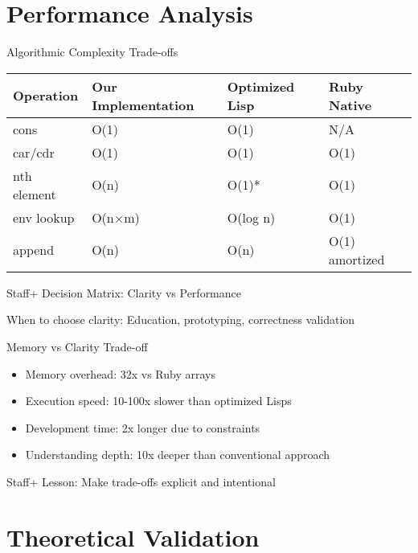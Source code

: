 \documentclass[presentation,aspectratio=169]{beamer}
\begin{document}
\section{Performance Analysis}
\label{sec:org7f197c2}

\begin{frame}[label={sec:org69e4c45}]{Algorithmic Complexity Trade-offs}
\begin{center}
\begin{center}
\begin{tabular}{llll}
Operation & Our Implementation & Optimized Lisp & Ruby Native\\
\hline
cons & O(1) & O(1) & N/A\\
car/cdr & O(1) & O(1) & O(1)\\
nth element & O(n) & O(1)* & O(1)\\
env lookup & O(n×m) & O(log n) & O(1)\\
append & O(n) & O(n) & O(1) amortized\\
\end{tabular}
\end{center}
\end{center}

\alert{Staff+ Decision Matrix}: Clarity vs Performance

\alert{When to choose clarity}: Education, prototyping, correctness validation
\end{frame}
\begin{frame}[label={sec:orgf72f475}]{Memory vs Clarity Trade-off}
\begin{itemize}[<+->]
\item \alert{Memory overhead}: 32x vs Ruby arrays
\item \alert{Execution speed}: 10-100x slower than optimized Lisps
\item \alert{Development time}: 2x longer due to constraints
\item \alert{Understanding depth}: 10x deeper than conventional approach
\end{itemize}

\pause

\alert{Staff+ Lesson}: Make trade-offs explicit and intentional
\end{frame}
\section{Theoretical Validation}
\label{sec:orgd9de9c4}
\end{document}
